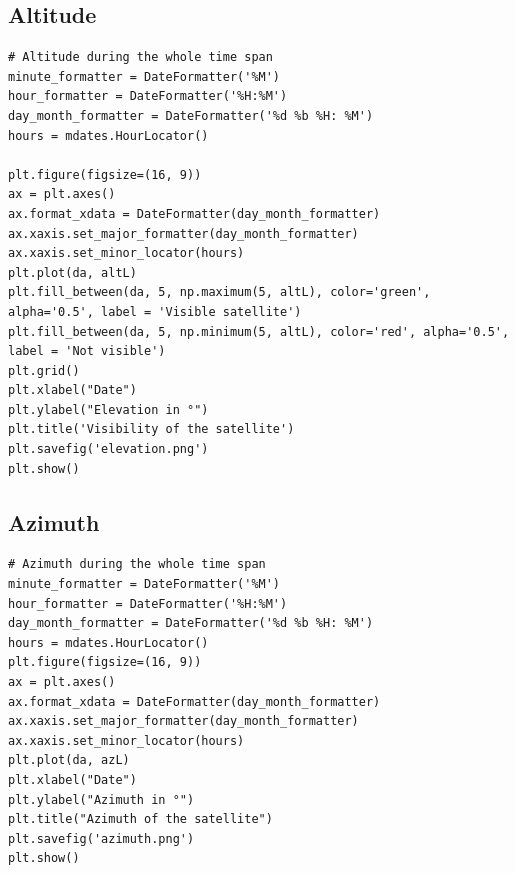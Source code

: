 \documentclass[a4paper,12pt,calibri,oneside,openany]{book}
\theoremstyle{break}
\begin{document}
\subsection{Altitude}
\begin{verbatim}
# Altitude during the whole time span
minute_formatter = DateFormatter('%M')
hour_formatter = DateFormatter('%H:%M')
day_month_formatter = DateFormatter('%d %b %H: %M')
hours = mdates.HourLocator() 

plt.figure(figsize=(16, 9))
ax = plt.axes()
ax.format_xdata = DateFormatter(day_month_formatter)
ax.xaxis.set_major_formatter(day_month_formatter)
ax.xaxis.set_minor_locator(hours)
plt.plot(da, altL)
plt.fill_between(da, 5, np.maximum(5, altL), color='green', alpha='0.5', label = 'Visible satellite')
plt.fill_between(da, 5, np.minimum(5, altL), color='red', alpha='0.5', label = 'Not visible')
plt.grid()
plt.xlabel("Date")
plt.ylabel("Elevation in °")
plt.title('Visibility of the satellite')
plt.savefig('elevation.png')
plt.show()
\end{verbatim}
\subsection{Azimuth}
\begin{verbatim}
# Azimuth during the whole time span
minute_formatter = DateFormatter('%M')
hour_formatter = DateFormatter('%H:%M')
day_month_formatter = DateFormatter('%d %b %H: %M')
hours = mdates.HourLocator() 
plt.figure(figsize=(16, 9))
ax = plt.axes()
ax.format_xdata = DateFormatter(day_month_formatter)
ax.xaxis.set_major_formatter(day_month_formatter)
ax.xaxis.set_minor_locator(hours) 
plt.plot(da, azL)
plt.xlabel("Date")
plt.ylabel("Azimuth in °")
plt.title("Azimuth of the satellite")
plt.savefig('azimuth.png')
plt.show()
\end{verbatim}
\end{document}
